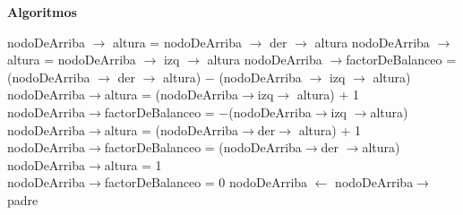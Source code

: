 \documentclass[a4paper,10pt]{article}
\newenvironment{Algoritmos}{%
  \vspace*{2ex}%
  \noindent\textbf{\Large Algoritmos}%
  \vspace*{2ex}%
}{}
\begin{document}
\begin{Algoritmos}
\begin{algorithm}[H]
{{{    {
    {nodoDeArriba $\rightarrow$ altura = nodoDeArriba $\rightarrow$ der $\rightarrow$ altura}
    {nodoDeArriba $\rightarrow$ altura = nodoDeArriba $\rightarrow$ izq $\rightarrow$ altura}
    {nodoDeArriba $\rightarrow$factorDeBalanceo = (nodoDeArriba $\rightarrow$ der $\rightarrow$ altura) $-$ (nodoDeArriba $\rightarrow$ izq $\rightarrow$ altura)}
    }
    {
    {nodoDeArriba$\rightarrow$altura = (nodoDeArriba$\rightarrow$izq$\rightarrow$ altura) + 1 \\
    nodoDeArriba$\rightarrow$factorDeBalanceo = $-$(nodoDeArriba$\rightarrow$izq $\rightarrow$altura)}
    {
    {nodoDeArriba$\rightarrow$altura = (nodoDeArriba$\rightarrow$der$\rightarrow$ altura) + 1 \\
    nodoDeArriba$\rightarrow$factorDeBalanceo = (nodoDeArriba$\rightarrow$der $\rightarrow$altura)}
    {nodoDeArriba$\rightarrow$altura = 1\\
    nodoDeArriba$\rightarrow$factorDeBalanceo = 0}
    }
    }
    {nodoDeArriba $\leftarrow$ nodoDeArriba$\rightarrow$padre}
    }
  }
 {} 
 
}
\end{algorithm}

\newpage


\end{Algoritmos}
\end{document}
